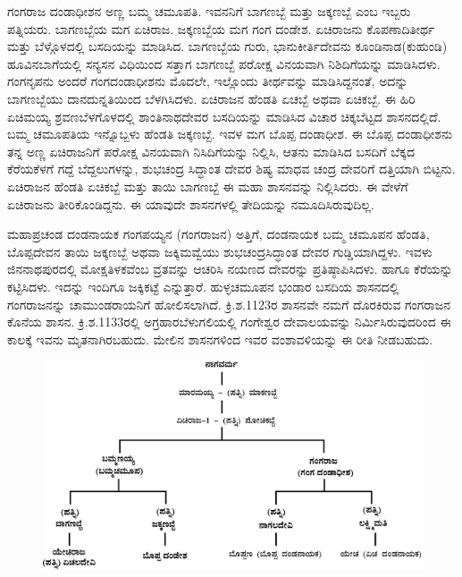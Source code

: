 ಗಂಗರಾಜ ದಂಡಾಧೀಶನ ಅಣ್ಣ ಬಮ್ಮ ಚಮೂಪತಿ. ಇವನನಿಗೆ ಬಾಗಣಬ್ಬೆ ಮತ್ತು ಜಕ್ಕಣಬ್ಬೆ ಎಂಬ ಇಬ್ಬರು ಪತ್ನಿಯರು. ಬಾಗಣಬ್ಬೆಯ ಮಗ ಏಚಿರಾಜ. ಜಕ್ಕಣಬ್ಬೆಯ ಮಗ ಗಂಗ ದಂಡೇಶ. ಏಚಿರಾಜನು ಕೊಪಣಾದಿತೀರ್ಥ ಮತ್ತು ಬೆಳ್ಗೊಳದಲ್ಲಿ ಬಸದಿಯನ್ನು ಮಾಡಿಸಿದ. ಬಾಗಣಬ್ಬೆಯ ಗುರು, ಭಾನುಕೀರ್ತಿದೇವನು ಕೂಂಡಿನಾಡ(ಕುಹುಂಡಿ) ಹೂವಿನಬಾಗೆಯಲ್ಲಿ ಸನ್ಯಸನ ವಿಧಿಯಿಂದ ಸತ್ತಾಗ ಬಾಗಣಬ್ಬೆ ಪರೋಕ್ಷ ವಿನಯವಾಗಿ ನಿಶಿದಿಗೆಯನ್ನು ಮಾಡಿಸಿದಳು. ಗಂಗನೃಪನು ಅಂದರೆ ಗಂಗದಂಡಾಧೀಶನು ಮೊದಲೇ, ಇಲ್ಲೊಂದು ತೀರ್ಥವನ್ನು ಮಾಡಿಸಿದ್ದನಂತೆ, ಅದನ್ನು ಬಾಗಣಬ್ಬೆಯು ದಾನದುನ್ನತಿಯಿಂದ ಬೆಳಗಿಸಿದಳು. ಏಚಿರಾಜನ ಹೆಂಡತಿ ಏಚಬ್ಬೆ ಅಥವಾ ಏಚಿಕಬ್ಬೆ. ಈ ಹಿರಿ ಏಚಿಮಯ್ಯ ಶ್ರವಣಬೆಳಗೊಳದಲ್ಲಿ ಶಾಂತಿನಾಥದೇವರ ಬಸದಿಯನ್ನು ಮಾಡಿಸಿದ ವಿಚಾರ ಚಿಕ್ಕಬೆಟ್ಟದ ಶಾಸನದಲ್ಲಿದೆ. ಬಮ್ಮ ಚಮೂಪತಿಯ ಇನ್ನೊಬ್ಬಳು ಹೆಂಡತಿ ಜಕ್ಕಣಬ್ಬೆ. ಇವಳ ಮಗ ಬೊಪ್ಪ ದಂಡಾಧೀಶ. ಈ ಬೊಪ್ಪ ದಂಡಾಧೀಶನು ತನ್ನ ಅಣ್ಣ ಏಚಿರಾಜನಿಗೆ ಪರೋಕ್ಷ ವಿನಯವಾಗಿ ನಿಸಿದಿಗೆಯನ್ನು ನಿಲ್ಲಿಸಿ, ಆತನು ಮಾಡಿಸಿದ ಬಸದಿಗೆ ಬೆಕ್ಕದ ಕೆರೆಯಕೆಳಗೆ ಗದ್ದೆ ಬೆದ್ದಲುಗಳನ್ನು, ಶುಭಚಂದ್ರ ಸಿದ್ಧಾಂತ ದೇವರ ಶಿಷ್ಯ ಮಾಧವ ಚಂದ್ರ ದೇವರಿಗೆ ದತ್ತಿಯಾಗಿ ಬಿಟ್ಟನು. ಏಚಿರಾಜನ ಹೆಂಡತಿ ಏಚಿಕಬ್ಬೆ ಮತ್ತು ತಾಯಿ ಬಾಗಣಬ್ಬೆ ಈ ಮಹಾ ಶಾಸನವನ್ನು ನಿಲ್ಲಿಸಿದರು. ಈ ವೇಳೆಗೆ ಏಚಿರಾಜನು ತೀರಿಕೊಂಡಿದ್ದನು. ಈ ಯಾವುದೇ ಶಾಸನಗಳಲ್ಲಿ ತೇದಿಯನ್ನು ನಮೂದಿಸಿರುವುದಿಲ್ಲ.

ಮಹಾಪ್ರಚಂಡ ದಂಡನಾಯಕ ಗಂಗಪಯ್ಯನ (ಗಂಗರಾಜನ) ಅತ್ತಿಗೆ, ದಂಡನಾಯಕ ಬಮ್ಮ ಚಮೂಪನ ಹೆಂಡತಿ, ಬೊಪ್ಪದೇವನ ತಾಯಿ ಜಕ್ಕಣಬ್ಬೆ ಅಥವಾ ಜಕ್ಕಿಮವ್ವೆಯು ಶುಭಚಂದ್ರಸಿದ್ಧಾಂತ ದೇವರ ಗುಡ್ಡಿಯಾಗಿದ್ದಳು. ಇವಳು ಜಿನನಾಥಪುರದಲ್ಲಿ ಮೋಕ್ಷತಿಳಕವೆಂಬ ವ್ರತವನ್ನು ಆಚರಿಸಿ ನಯಣದ ದೇವರನ್ನು ಪ್ರತಿಷ್ಠಾಪಿಸಿದಳು. ಹಾಗೂ ಕೆರೆಯನ್ನು ಕಟ್ಟಿಸಿದಳು. ಇದನ್ನು ಇಂದಿಗೂ ಜಕ್ಕಿಕಟ್ಟೆ ಎನ್ನುತ್ತಾರೆ. ಹುಳ್ಳಚಮೂಪನ ಭಂಡಾರ ಬಸದಿಯ ಶಾಸನದಲ್ಲಿ ಗಂಗರಾಜನನ್ನು ಚಾಮುಂಡರಾಯನಿಗೆ ಹೋಲಿಸಲಾಗಿದೆ. ಕ್ರಿ.ಶ.1123ರ ಶಾಸನವೇ ನಮಗೆ ದೊರಕಿರುವ ಗಂಗರಾಜನ ಕೊನೆಯ ಶಾಸನ. ಕ್ರಿ.ಶ.1133ರಲ್ಲಿ ಅಗ್ರಹಾರಬೆಳುಗಲಿಯಲ್ಲಿ ಗಂಗೇಶ್ವರ ದೇವಾಲಯವನ್ನು ನಿರ್ಮಿಸಿರುವುದರಿಂದ ಈ ಕಾಲಕ್ಕೆ ಇವನು ಮೃತನಾಗಿರಬಹುದು. ಮೇಲಿನ ಶಾಸನಗಳಿಂದ ಇವರ ವಂಶಾವಳಿಯನ್ನು ಈ ರೀತಿ ನೀಡಬಹುದು.

\begin{figure}[H]
\includegraphics[scale=1.15]{images/chap3/chap3fig11.jpeg}
\end{figure}

